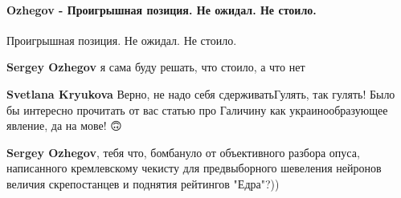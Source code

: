  
 
 
 
 
\paragraph{Ozhegov - Проигрышная позиция. Не ожидал. Не стоило.}
\label{sec:14_07_2021.fb.krjukova_svetlana.1.statja_putina_mnenie.cmt.ozhegov_pozicia_proigrysh}

\begin{itemize}
 
Проигрышная позиция.
Не ожидал. Не стоило. 

\begin{itemize}
 
\textbf{Sergey Ozhegov} я сама буду решать, что стоило, а что нет

 
\textbf{Svetlana Kryukova} Верно, не надо себя сдерживать\Smiley[1.0][yellow] Гулять, так гулять! Было бы интересно прочитать от вас статью про Галичину как украинообразующее явление, да на мове! 🙃

 
\textbf{Sergey Ozhegov}, тебя что, бомбануло от объективного разбора опуса, написанного кремлевскому чекисту для предвыборного шевеления нейронов величия скрепостанцев и поднятия рейтингов "Едра"?))

 

\end{itemize}
\end{itemize}
